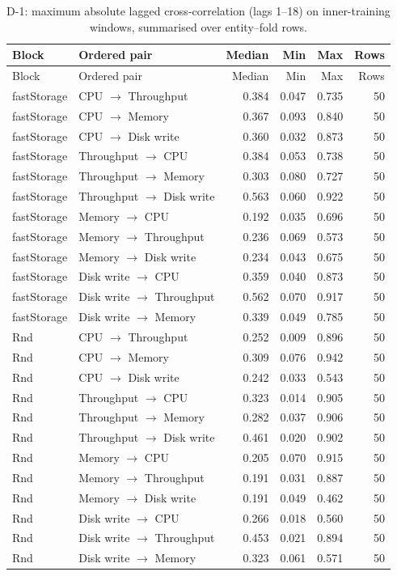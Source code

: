 \begin{longtable}{@{}llrrrr@{}}
\caption{D-1: maximum absolute lagged cross-correlation (lags 1--18) on inner-training windows, summarised over entity--fold rows.}\label{tab:supp-t2-d1}\\
\toprule
Block & Ordered pair & Median & Min & Max & Rows \\
\midrule
\endfirsthead
\toprule
Block & Ordered pair & Median & Min & Max & Rows \\
\midrule
\endhead
\bottomrule
\endfoot
fastStorage & CPU $\rightarrow$ Throughput & 0.384 & 0.047 & 0.735 & 50 \\
fastStorage & CPU $\rightarrow$ Memory & 0.367 & 0.093 & 0.840 & 50 \\
fastStorage & CPU $\rightarrow$ Disk write & 0.360 & 0.032 & 0.873 & 50 \\
fastStorage & Throughput $\rightarrow$ CPU & 0.384 & 0.053 & 0.738 & 50 \\
fastStorage & Throughput $\rightarrow$ Memory & 0.303 & 0.080 & 0.727 & 50 \\
fastStorage & Throughput $\rightarrow$ Disk write & 0.563 & 0.060 & 0.922 & 50 \\
fastStorage & Memory $\rightarrow$ CPU & 0.192 & 0.035 & 0.696 & 50 \\
fastStorage & Memory $\rightarrow$ Throughput & 0.236 & 0.069 & 0.573 & 50 \\
fastStorage & Memory $\rightarrow$ Disk write & 0.234 & 0.043 & 0.675 & 50 \\
fastStorage & Disk write $\rightarrow$ CPU & 0.359 & 0.040 & 0.873 & 50 \\
fastStorage & Disk write $\rightarrow$ Throughput & 0.562 & 0.070 & 0.917 & 50 \\
fastStorage & Disk write $\rightarrow$ Memory & 0.339 & 0.049 & 0.785 & 50 \\
Rnd & CPU $\rightarrow$ Throughput & 0.252 & 0.009 & 0.896 & 50 \\
Rnd & CPU $\rightarrow$ Memory & 0.309 & 0.076 & 0.942 & 50 \\
Rnd & CPU $\rightarrow$ Disk write & 0.242 & 0.033 & 0.543 & 50 \\
Rnd & Throughput $\rightarrow$ CPU & 0.323 & 0.014 & 0.905 & 50 \\
Rnd & Throughput $\rightarrow$ Memory & 0.282 & 0.037 & 0.906 & 50 \\
Rnd & Throughput $\rightarrow$ Disk write & 0.461 & 0.020 & 0.902 & 50 \\
Rnd & Memory $\rightarrow$ CPU & 0.205 & 0.070 & 0.915 & 50 \\
Rnd & Memory $\rightarrow$ Throughput & 0.191 & 0.031 & 0.887 & 50 \\
Rnd & Memory $\rightarrow$ Disk write & 0.191 & 0.049 & 0.462 & 50 \\
Rnd & Disk write $\rightarrow$ CPU & 0.266 & 0.018 & 0.560 & 50 \\
Rnd & Disk write $\rightarrow$ Throughput & 0.453 & 0.021 & 0.894 & 50 \\
Rnd & Disk write $\rightarrow$ Memory & 0.323 & 0.061 & 0.571 & 50 \\
\end{longtable}
